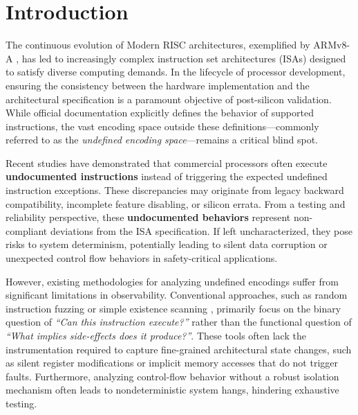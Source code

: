 \documentclass[pdflatex,sn-mathphys]{sn-jnl}%
\theoremstyle{thmstyleone}%
\theoremstyle{thmstyletwo}%
\theoremstyle{thmstylethree}%
\begin{document}
\section{Introduction}\label{sec:intro}

The continuous evolution of Modern RISC architectures, exemplified by ARMv8-A \cite{armv8_ref}, has led to increasingly complex instruction set architectures (ISAs) designed to satisfy diverse computing demands. In the lifecycle of processor development, ensuring the consistency between the hardware implementation and the architectural specification is a paramount objective of post-silicon validation. While official documentation explicitly defines the behavior of supported instructions, the vast encoding space outside these definitions—commonly referred to as the \textit{undefined encoding space}—remains a critical blind spot.

Recent studies \cite{domas2017breaking, strupe2020uncovering} have demonstrated that commercial processors often execute \textbf{undocumented instructions} instead of triggering the expected undefined instruction exceptions. These discrepancies may originate from legacy backward compatibility, incomplete feature disabling, or silicon errata. From a testing and reliability perspective, these \textbf{undocumented behaviors} represent non-compliant deviations from the ISA specification. If left uncharacterized, they pose risks to system determinism, potentially leading to silent data corruption or unexpected control flow behaviors in safety-critical applications.

However, existing methodologies for analyzing undefined encodings suffer from significant limitations in observability. Conventional approaches, such as random instruction fuzzing \cite{li2019uisfuzz} or simple existence scanning \cite{strupe2020uncovering}, primarily focus on the binary question of \textit{``Can this instruction execute?''} rather than the functional question of \textit{``What implies side-effects does it produce?''}. These tools often lack the instrumentation required to capture fine-grained architectural state changes, such as silent register modifications or implicit memory accesses that do not trigger faults. Furthermore, analyzing control-flow behavior without a robust isolation mechanism often leads to nondeterministic system hangs, hindering exhaustive testing.
\end{document}
